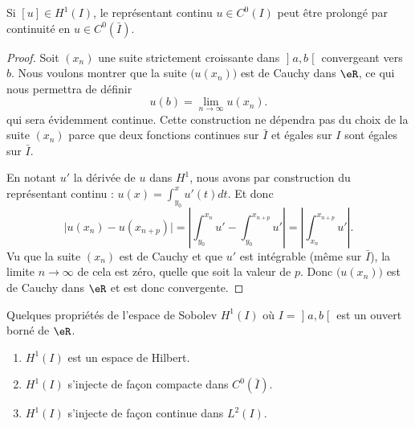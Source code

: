 \begin{corollary}   \label{CorCEPJGAu}
	Si \( [u]\in H^1(I)\), le représentant continu \( u\in C^0(I)\) peut être prolongé par continuité en \( u\in C^0(\bar I)\).
\end{corollary}

\begin{proof}
	Soit \( (x_n)\) une suite strictement croissante dans \( \mathopen] a , b \mathclose[\) convergeant vers \( b\). Nous voulons montrer que la suite \( \big( u(x_n) \big)\) est de Cauchy dans \( \eR\), ce qui nous permettra de définir
	\begin{equation}
		u(b)=\lim_{n\to \infty} u(x_n).
	\end{equation}
	qui sera évidemment continue. Cette construction ne dépendra pas du choix de la suite \( (x_n)\) parce que deux fonctions continues sur \( \bar I\) et égales sur \( I\) sont égales sur \( \bar I\).

	En notant \( u'\) la dérivée de \( u\) dans \( H^1\), nous avons par construction du représentant continu : \( u(x)=\int_{y_0}^xu'(t)dt\). Et donc
	\begin{equation}
		\big| u(x_n)-u(x_{n+p}) \big|=\left| \int_{y_0}^{x_n}u'-\int_{y_0}^{x_{n+p}}u' \right| =\left| \int_{x_n}^{x_{n+p}}u' \right| .
	\end{equation}
	Vu que la suite \( (x_n)\) est de Cauchy et que \( u'\) est intégrable (même sur \( \bar I\)), la limite \( n\to\infty\) de cela est zéro, quelle que soit la valeur de \( p\). Donc \( \big( u(x_n) \big)\) est de Cauchy dans \( \eR\) et est donc convergente.
\end{proof}

\begin{proposition}     \label{ThoESIyxfU}
	Quelques propriétés de l'espace de Sobolev \( H^1(I)\) où \( I=\mathopen] a , b \mathclose[\) est un ouvert borné de \( \eR\).
	\begin{enumerate}
		\item       \label{ITEMooITQUooKWwMwu}
		      \( H^1(I)\) est un espace de Hilbert.
		\item
		      \( H^1(I)\) s'injecte de façon compacte dans \( C^0(\bar I)\).
		\item
		      \( H^1(I)\) s'injecte de façon continue dans \( L^2(I)\).
	\end{enumerate}
\end{proposition}


